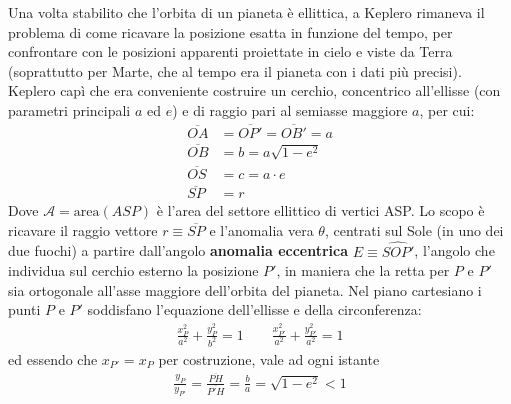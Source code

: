 \documentclass[a4paper, oneside]{book}
\begin{document}
\begin{figure}
\end{figure}
Una volta stabilito che l'orbita di un pianeta è ellittica, a Keplero 
rimaneva il problema di come ricavare la posizione esatta in funzione del tempo, per 
confrontare con le posizioni apparenti proiettate in cielo e 
viste da Terra (soprattutto per Marte, che al tempo era il pianeta con i dati più
precisi). Keplero capì che era conveniente costruire un cerchio, 
concentrico all'ellisse (con parametri principali $a$ ed $e$)
e di raggio pari al semiasse maggiore $a$, per cui:
    \begin{align*}
        \overline{OA} &= \overline{OP'}   = \overline{OB'} = a \\
        \overline{OB} &= b = a\sqrt{1 - e^{2}} \\
        \overline{OS} &= c = a\cdot e \\
        \overline{SP} &= r   
    \end{align*}
Dove $\mathcal{A} = \text{area}(ASP)$ è l'area del settore ellittico di vertici ASP.
Lo scopo è ricavare il raggio vettore $r \equiv \overline{SP}$ e l'anomalia 
vera $\theta$, centrati sul Sole (in uno dei due fuochi) a partire dall'angolo 
\textbf{anomalia eccentrica} $E \equiv \widehat{SOP'}$, l'angolo che individua
sul cerchio esterno la posizione $P'$, in maniera che la retta per $P$ e $P'$ 
sia ortogonale all'asse maggiore dell'orbita del pianeta. Nel piano cartesiano 
i punti $P$ e $P'$  soddisfano l'equazione dell'ellisse e della circonferenza:
\begin{gather*}
    \frac{x^{2}_P}{a^{2}} + \frac{y^{2}_P}{b^{2}} = 1 \qquad \frac{x^{2}_{P'}}{a^{2}} + \frac{y^{2}_{P'}}{a^{2}} = 1
\end{gather*}
ed essendo che $x_{P'} = x_P$ per costruzione, vale ad ogni istante 
\begin{gather*}
    \frac{y_P}{y_{P'}} = \frac{\overline{PH} }{\overline{P'H} } = \frac{b}{a} = \sqrt{1 - e^{2}} < 1 
\end{gather*}
\end{document}
